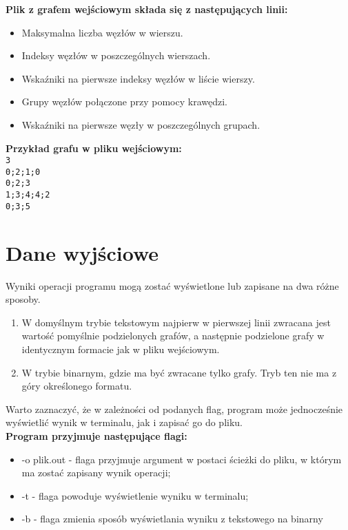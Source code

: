 \documentclass{article}
\begin{document}
\textbf{Plik z grafem wejściowym składa się z następujących linii:}

\begin{itemize}
  \item Maksymalna liczba węzłów w wierszu.
  \item Indeksy węzłów w poszczególnych wierszach.
  \item Wskaźniki na pierwsze indeksy węzłów w liście wierszy.
  \item Grupy węzłów połączone przy pomocy krawędzi.
  \item Wskaźniki na pierwsze węzły w poszczególnych grupach.
\end{itemize}
\textbf{Przykład grafu w pliku wejściowym:}\\
\texttt{3\\0;2;1;0\\0;2;3\\1;3;4;4;2\\0;3;5}

\section*{Dane wyjściowe}
Wyniki operacji programu mogą zostać wyświetlone lub zapisane na dwa różne sposoby.
\begin{enumerate}
\item W domyślnym trybie tekstowym najpierw w pierwszej linii zwracana jest wartość pomyślnie podzielonych grafów, a następnie podzielone grafy w identycznym formacie jak w pliku wejściowym.

\item W trybie binarnym, gdzie ma być zwracane tylko grafy. Tryb ten nie ma z góry określonego formatu.
\end{enumerate}

Warto zaznaczyć, że w zależności od podanych flag, program może jednocześnie wyświetlić wynik w terminalu, jak i zapisać go do pliku.\\

\textbf{Program przyjmuje następujące flagi:}
\begin{itemize}
\item -o plik.out - flaga przyjmuje argument w postaci ścieżki do pliku, w którym ma zostać zapisany wynik operacji;

\item -t - flaga powoduje wyświetlenie wyniku w terminalu;

\item -b - flaga zmienia sposób wyświetlania wyniku z tekstowego na binarny
\end{itemize}
\end{document}
